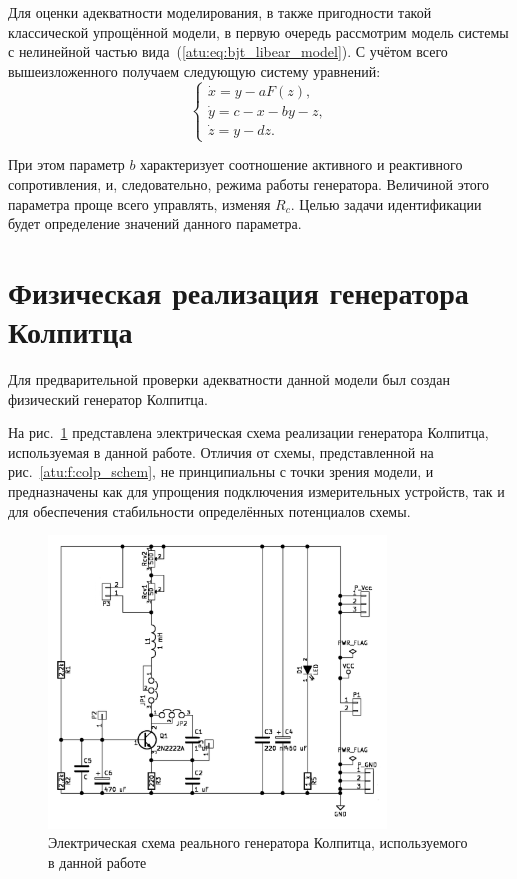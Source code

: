 Для оценки адекватности моделирования, в также пригодности
такой классической упрощённой модели, в первую очередь
рассмотрим модель системы с нелинейной частью вида~(\ref{atu:eq:bjt_libear_model}).
С учётом всего вышеизложенного получаем следующую систему уравнений:
%
\begin{equation}
\label{atu:eq:colp}
\begin{cases}
  \dot{x} = y - a F(z), \\
  \dot{y} = c - x - by - z, \\
  \dot{z} = y - d z.
\end{cases}
\end{equation}

При этом параметр $b$ характеризует соотношение
активного и реактивного сопротивления,
и, следовательно, режима работы генератора.
Величиной этого параметра проще всего управлять,
изменяя $R_c$.
Целью задачи идентификации  будет определение значений данного параметра.




\section{Физическая реализация генератора Колпитца} %

Для предварительной проверки адекватности данной модели
был создан физический генератор Колпитца.

На рис.~\ref{atu:f:colp_schem_real} представлена электрическая схема
реализации генератора Колпитца, используемая в данной работе.
Отличия от схемы,
представленной на рис.~\ref{atu:f:colp_schem},
не принципиальны с точки зрения модели,
и предназначены как для упрощения подключения
измерительных устройств, так и для
обеспечения стабильности определённых потенциалов схемы.

\begin{figure}[htb!]
\centerline{\includegraphics[width=0.8\textwidth]{p/colp_schem_real.png} }
\caption{Электрическая схема реального генератора Колпитца, используемого в данной работе}
\label{atu:f:colp_schem_real}
\end{figure}

